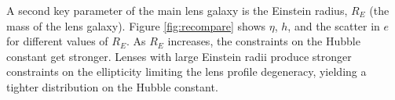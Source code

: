 A second key parameter of the main lens galaxy is the Einstein radius, $R_E$ (the mass of the lens galaxy). Figure \ref{fig:recompare} shows $\eta$, $h$, and the scatter in $e$ for different values of $R_E$. As $R_E$ increases, the constraints on the Hubble constant get stronger. Lenses with large Einstein radii produce stronger constraints on the ellipticity limiting the lens profile degeneracy, yielding a tighter distribution on the Hubble constant.
  
